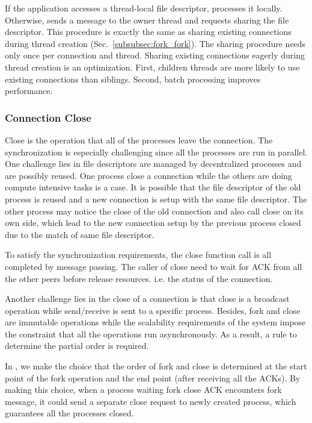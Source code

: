 If the application accesses a thread-local file descriptor, \libipc processes it locally. Otherwise, \libipc sends a message to the owner thread and requests sharing the file descriptor. This procedure is exactly the same as sharing existing connections during thread creation (Sec.~\ref{subsubsec:fork_fork}). The sharing procedure needs only once per connection and thread. Sharing existing connections eagerly during thread creation is an optimization. First, children threads are more likely to use existing connections than siblings. Second, batch processing improves performance.

\subsubsection{Connection Close}
\label{subsubsec:fork_close}

Close is the operation that all of the processes leave the connection. The synchronization is  especially challenging since all the processes are run in parallel. One challenge lies in file descriptors are managed by decentralized processes and are possibly reused. One process close a connection while the others are doing compute intensive tasks is a case. It is possible that the file descriptor of the old process is reused and a new connection is setup with the same file descriptor. The other process may notice the close of the old connection and also call close on its own side, which lead to the new connection setup by the previous process closed due to the match of same file descriptor. 

To satisfy the synchronization requirements, the close function call is all completed by message passing. The caller of close need to wait for ACK from all the other peers before release resources. i.e. the status of the connection.

Another challenge lies in the close of a connection is that close is a broadcast operation while send/receive is sent to a specific process. Besides, fork and close are immutable operations while the scalability requirements of the system impose the constraint that all the operations run asynchronously. As a result, a rule to determine the partial order is required.

In \libipc, we make the choice that the order of fork and close is determined at the start point of the fork operation and the end point (after receiving all the ACKs). By making this choice, when a process waiting fork close ACK encounters fork message, it could send a separate close request to newly created process, which guarantees all the processes closed.
  
